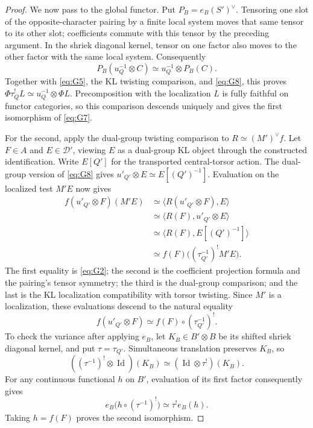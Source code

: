 \documentclass[11pt]{article}
\numberwithin{equation}{section}
\theoremstyle{definition}
\theoremstyle{remark}
\begin{document}
\begin{proof}
We now pass to the global functor.  Put \(P_B=e_B(S')^\vee\).
Tensoring one slot of the opposite-character pairing by a finite
local system moves that same tensor to its other slot; coefficients
commute with this tensor by the preceding argument.  In the shriek
diagonal kernel, tensor on one factor also moves to the other factor
with the same local system.  Consequently
\[
 P_B(u_Q^{-1}\otimes C)\simeq u_Q^{-1}\otimes P_B(C).
\]
Together with \eqref{eq:G5}, the KL twisting comparison, and
\eqref{eq:G8}, this proves
\(\Phi\tau_Q^!L\simeq u_Q^{-1}\otimes\Phi L\).
Precomposition with the localization \(L\) is fully faithful on
functor categories, so this comparison descends uniquely and gives
the first isomorphism of \eqref{eq:G7}.

For the second, apply the dual-group twisting comparison to
\(R\simeq(M')^\vee f\).  Let \(F\in A\) and \(E\in\mathcal D'\),
viewing \(E\) as a dual-group KL object through the constructed
identification.  Write \(E[Q']\) for the transported central-torsor
action.  The dual-group version of \eqref{eq:G8} gives
\(u'_{Q'}\otimes E\simeq E[(Q')^{-1}]\).  Evaluation on the
localized test \(M'E\) now gives
\[
 \begin{aligned}
 f(u'_{Q'}\otimes F)(M'E)
 &\simeq\bigl\langle R(u'_{Q'}\otimes F),E\bigr\rangle\\
 &\simeq\bigl\langle R(F),u'_{Q'}\otimes E\bigr\rangle\\
 &\simeq\bigl\langle R(F),E[(Q')^{-1}]\bigr\rangle\\
 &\simeq f(F)\bigl((\tau_{Q'}^{-1})^!M'E\bigr).
 \end{aligned}
\]
The first equality is \eqref{eq:G2}; the second is the coefficient
projection formula and the pairing's tensor symmetry; the third is
the dual-group comparison; and the last is the KL localization
compatibility with torsor twisting.  Since \(M'\) is a localization,
these evaluations descend to the natural equality
\[
 f(u'_{Q'}\otimes F)
 \simeq f(F)\circ(\tau_{Q'}^{-1})^!.
\]
To check the variance after applying \(e_B\), let
\(K_B\in B'\otimes B\) be its shifted shriek diagonal kernel,
and put \(\tau=\tau_{Q'}\).  Simultaneous translation preserves
\(K_B\), so
\[
 ((\tau^{-1})^!\otimes\operatorname{Id})(K_B)
   \simeq(\operatorname{Id}\otimes\tau^!)(K_B).
\]
For any continuous functional \(h\) on \(B'\), evaluation of
its first factor consequently gives
\[
 e_B\bigl(h\circ(\tau^{-1})^!\bigr)
   \simeq\tau^!e_B(h).
\]
Taking \(h=f(F)\) proves the second isomorphism.


\end{proof}
\end{document}
